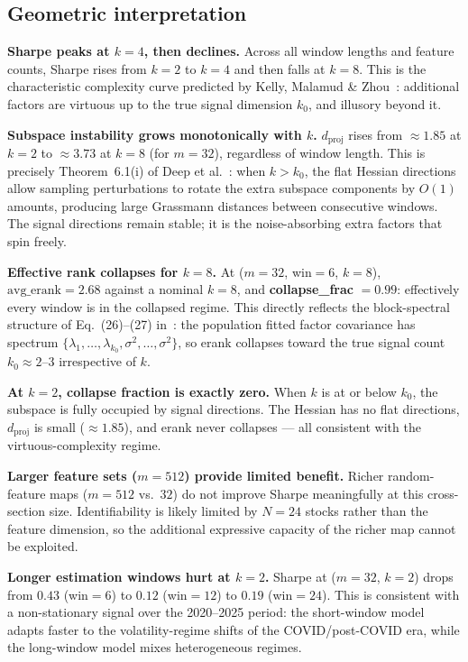 \documentclass[11pt, a4paper]{article}
\begin{document}
\subsection{Geometric interpretation}

\textbf{Sharpe peaks at $k=4$, then declines.}\;
Across all window lengths and feature counts, Sharpe rises from $k=2$ to $k=4$ and then falls at $k=8$. This is the characteristic complexity curve predicted by Kelly, Malamud \& Zhou~\cite{KMZ2024}: additional factors are virtuous up to the true signal dimension $k_0$, and illusory beyond it.

\textbf{Subspace instability grows monotonically with $k$.}\;
$d_{\mathrm{proj}}$ rises from $\approx 1.85$ at $k=2$ to $\approx 3.73$ at $k=8$ (for $m=32$), regardless of window length. This is precisely Theorem~6.1(i) of Deep et al.~\cite{DLMP2026}: when $k > k_0$, the flat Hessian directions allow sampling perturbations to rotate the extra subspace components by $O(1)$ amounts, producing large Grassmann distances between consecutive windows. The signal directions remain stable; it is the noise-absorbing extra factors that spin freely.

\textbf{Effective rank collapses for $k=8$.}\;
At ($m=32$, win$=6$, $k=8$), $\mathrm{avg\_erank} = 2.68$ against a nominal $k=8$, and \textbf{collapse\_frac} $= 0.99$: effectively every window is in the collapsed regime. This directly reflects the block-spectral structure of Eq.~(26)--(27) in~\cite{DLMP2026}: the population fitted factor covariance has spectrum $\{\lambda_1,\ldots,\lambda_{k_0}, \sigma^2, \ldots, \sigma^2\}$, so erank collapses toward the true signal count $k_0 \approx 2$--$3$ irrespective of $k$.

\textbf{At $k=2$, collapse fraction is exactly zero.}\;
When $k$ is at or below $k_0$, the subspace is fully occupied by signal directions. The Hessian has no flat directions, $d_{\mathrm{proj}}$ is small ($\approx 1.85$), and erank never collapses --- all consistent with the virtuous-complexity regime.

\textbf{Larger feature sets ($m=512$) provide limited benefit.}\;
Richer random-feature maps ($m=512$ vs.\ $32$) do not improve Sharpe meaningfully at this cross-section size. Identifiability is likely limited by $N=24$ stocks rather than the feature dimension, so the additional expressive capacity of the richer map cannot be exploited.

\textbf{Longer estimation windows hurt at $k=2$.}\;
Sharpe at ($m=32$, $k=2$) drops from $0.43$ (win$=6$) to $0.12$ (win$=12$) to $0.19$ (win$=24$). This is consistent with a non-stationary signal over the 2020--2025 period: the short-window model adapts faster to the volatility-regime shifts of the COVID/post-COVID era, while the long-window model mixes heterogeneous regimes.
\end{document}
